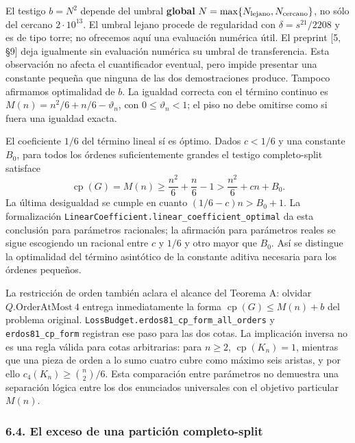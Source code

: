 \documentclass[spanish,11pt,a4paper]{article}
\begin{document}
El testigo \(b=N^2\) depende del umbral \textbf{global} \(N=\max\{N_{\rm lejano},N_{\rm cercano}\}\), no sólo del cercano \(2\cdot10^{13}\). El umbral lejano procede de regularidad con \(\delta=s^{21}/2208\) y es de tipo torre; no ofrecemos aquí una evaluación numérica útil. El preprint {[}5, §9{]} deja igualmente sin evaluación numérica su umbral de transferencia. Esta observación no afecta el cuantificador eventual, pero impide presentar una constante pequeña que ninguna de las dos demostraciones produce. Tampoco afirmamos optimalidad de \(b\). La igualdad correcta con el término continuo es \(M(n)=n^2/6+n/6-\vartheta_n\), con \(0\le\vartheta_n<1\); el piso no debe omitirse como si fuera una igualdad exacta.

El coeficiente \(1/6\) del término lineal sí es óptimo. Dados \(c<1/6\) y una constante \(B_0\), para todos los órdenes suficientemente grandes el testigo completo-split satisface \[
\operatorname{cp}(G)=M(n)
\ge\frac{n^2}{6}+\frac n6-1
>\frac{n^2}{6}+cn+B_0.
\tag{6.5}
\] La última desigualdad se cumple en cuanto \((1/6-c)n>B_0+1\). La formalización \nolinkurl{LinearCoefficient.linear_coefficient_optimal} da esta conclusión para parámetros racionales; la afirmación para parámetros reales se sigue escogiendo un racional entre \(c\) y \(1/6\) y otro mayor que \(B_0\). Así se distingue la optimalidad del término asintótico de la constante aditiva necesaria para los órdenes pequeños.

La restricción de orden también aclara el alcance del Teorema A: olvidar \(Q.\mathrm{OrderAtMost}\ 4\) entrega inmediatamente la forma \(\operatorname{cp}(G)\le M(n)+b\) del problema original. \nolinkurl{LossBudget.erdos81_cp_form_all_orders} y \nolinkurl{erdos81_cp_form} registran ese paso para las dos cotas. La implicación inversa no es una regla válida para cotas arbitrarias: para \(n\ge2\), \(\operatorname{cp}(K_n)=1\), mientras que una pieza de orden a lo sumo cuatro cubre como máximo seis aristas, y por ello \(c_4(K_n)\ge\binom n2/6\). Esta comparación entre parámetros no demuestra una separación lógica entre los dos enunciados universales con el objetivo particular \(M(n)\).

\subsubsection{6.4. El exceso de una partición completo-split}\label{el-exceso-de-una-particiuxf3n-completo-split}
\end{document}
